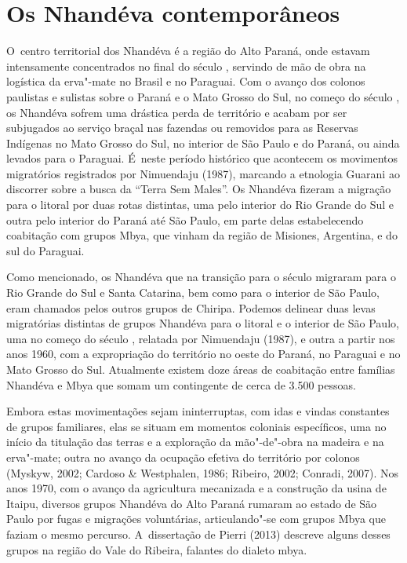 \section{Os Nhandéva contemporâneos}

O~centro territorial dos Nhandéva é a região do Alto Paraná, onde
estavam intensamente concentrados no final do século , servindo de
mão de obra na logística da erva"-mate no Brasil e no Paraguai. Com o
avanço dos colonos paulistas e sulistas sobre o Paraná e o Mato Grosso
do Sul, no começo do século , os Nhandéva sofrem uma drástica perda
de território e acabam por ser subjugados ao serviço braçal nas
fazendas ou removidos para as Reservas Indígenas no Mato Grosso do Sul,
no interior de São Paulo e do Paraná, ou ainda levados para o Paraguai.
É~neste período histórico que acontecem os movimentos migratórios
registrados por Nimuendaju (1987), marcando a etnologia Guarani ao
discorrer sobre a busca da ``Terra Sem Males''. Os Nhandéva fizeram a
migração para o litoral por duas rotas distintas, uma pelo interior do
Rio Grande do Sul e outra pelo interior do Paraná até São Paulo, em
parte delas estabelecendo coabitação com grupos Mbya, que vinham da
região de Misiones, Argentina, e do sul do Paraguai.

Como mencionado, os Nhandéva que na transição para o século 
migraram para o Rio Grande do Sul e Santa Catarina, bem como para o
interior de São Paulo, eram chamados pelos outros grupos de Chiripa.
Podemos delinear duas levas migratórias distintas de grupos Nhandéva
para o litoral e o interior de São Paulo, uma no começo do século ,
relatada por Nimuendaju (1987), e outra a partir nos anos 1960, com a
expropriação do território no oeste do Paraná, no Paraguai e no Mato
Grosso do Sul. Atualmente existem doze áreas de coabitação entre
famílias Nhandéva e Mbya que somam um contingente de cerca de 3.500
pessoas.

Embora estas movimentações sejam ininterruptas, com idas e
vindas constantes de grupos familiares, elas se situam em momentos
coloniais específicos, uma no início da titulação das terras e a
exploração da mão"-de"-obra na madeira e na erva"-mate; outra no avanço da
ocupação efetiva do território por colonos (Myskyw, 2002; Cardoso \&
Westphalen, 1986; Ribeiro, 2002; Conradi, 2007). Nos anos 1970, com o
avanço da agricultura mecanizada e a construção da usina de Itaipu,
diversos grupos Nhandéva do Alto Paraná rumaram ao estado de São Paulo
por fugas e migrações voluntárias, articulando"-se com grupos Mbya que
faziam o mesmo percurso. A~dissertação de Pierri (2013) descreve
alguns desses grupos na região do Vale do Ribeira, falantes do dialeto
mbya.

